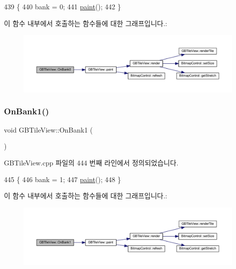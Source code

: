 \begin{DoxyCode}
439 \{
440   bank = 0;
441   \mbox{\hyperlink{class_g_b_tile_view_aa78a471956e777509644a0a04bab2c4d}{paint}}();
442 \}
\end{DoxyCode}
이 함수 내부에서 호출하는 함수들에 대한 그래프입니다.\+:
\nopagebreak
\begin{figure}[H]
\begin{center}
\leavevmode
\includegraphics[width=350pt]{class_g_b_tile_view_a35e281e40e9fd8867f04a01595f54ef2_cgraph}
\end{center}
\end{figure}
\mbox{\label{class_g_b_tile_view_a5c1db6a1066d8e37b743ca2407652b7d}} 
\subsubsection{\texorpdfstring{On\+Bank1()}{OnBank1()}}
{\footnotesize\ttfamily void G\+B\+Tile\+View\+::\+On\+Bank1 (\begin{DoxyParamCaption}{ }\end{DoxyParamCaption})\hspace{0.3cm}{\ttfamily [protected]}}



G\+B\+Tile\+View.\+cpp 파일의 444 번째 라인에서 정의되었습니다.


\begin{DoxyCode}
445 \{
446   bank = 1;
447   \mbox{\hyperlink{class_g_b_tile_view_aa78a471956e777509644a0a04bab2c4d}{paint}}();
448 \}
\end{DoxyCode}
이 함수 내부에서 호출하는 함수들에 대한 그래프입니다.\+:
\nopagebreak
\begin{figure}[H]
\begin{center}
\leavevmode
\includegraphics[width=350pt]{class_g_b_tile_view_a5c1db6a1066d8e37b743ca2407652b7d_cgraph}
\end{center}
\end{figure}
\mbox{\label{class_g_b_tile_view_afb45c55e706bed1468f547510490fa2a}} 
